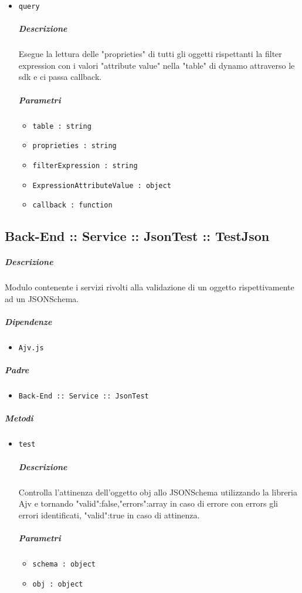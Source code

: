 \documentclass[../ManualeSviluppatore_v1.0.0.tex]{subfiles}
\begin{document}
\begin{itemize}
\item \texttt{query}
\subparagraph{Descrizione} Esegue la lettura delle "proprieties" di tutti gli oggetti rispettanti la filter expression con i valori "attribute value" nella "table" di dynamo attraverso le sdk e ci passa callback.
\subparagraph{Parametri}
\begin{itemize}
	\item \texttt{table : string}
	\item \texttt{proprieties : string}
	\item \texttt{filterExpression : string}
	\item \texttt{ExpressionAttributeValue : object}
	\item \texttt{callback : function}
\end{itemize}
\end{itemize}

\subsection{Back-End :: Service :: JsonTest :: TestJson}
\subparagraph{Descrizione} Modulo contenente i servizi rivolti alla validazione di un oggetto rispettivamente ad un JSONSchema.
\subparagraph{Dipendenze}
\begin{itemize}
	\item \texttt{Ajv.js}
\end{itemize}
\subparagraph{Padre}
\begin{itemize}
	\item \texttt{Back-End :: Service :: JsonTest}
\end{itemize}
\subparagraph{Metodi}\begin{itemize}
\item \texttt{test}
\subparagraph{Descrizione} Controlla l'attinenza dell'oggetto obj allo JSONSchema utilizzando la libreria Ajv e tornando {"valid":false,"errors":array} in caso di errore con errors gli errori identificati, {"valid":true} in caso di attinenza.
\subparagraph{Parametri}
\begin{itemize}
	\item \texttt{schema : object}
	\item \texttt{obj : object}
\end{itemize}
\end{itemize}

\newpage
\end{document}
